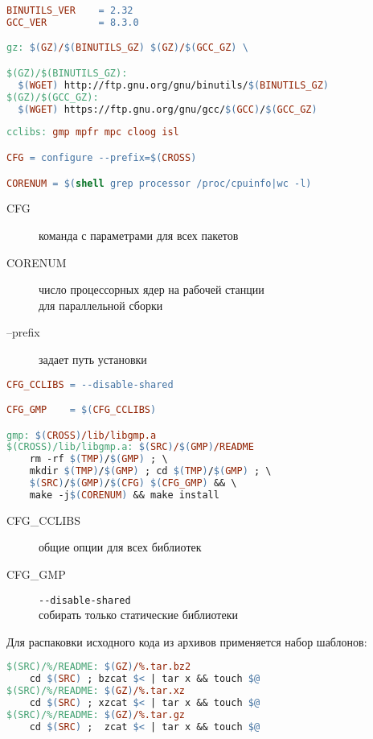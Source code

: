 \clearpage
\begin{lstlisting}[language=make]
BINUTILS_VER	= 2.32
GCC_VER			= 8.3.0

gz: $(GZ)/$(BINUTILS_GZ) $(GZ)/$(GCC_GZ) \

$(GZ)/$(BINUTILS_GZ):
  $(WGET) http://ftp.gnu.org/gnu/binutils/$(BINUTILS_GZ)
$(GZ)/$(GCC_GZ):
  $(WGET) https://ftp.gnu.org/gnu/gcc/$(GCC)/$(GCC_GZ)
\end{lstlisting}

\begin{lstlisting}[language=make]
cclibs: gmp mpfr mpc cloog isl

CFG = configure --prefix=$(CROSS)

CORENUM = $(shell grep processor /proc/cpuinfo|wc -l)
\end{lstlisting}


\begin{description}
\item[CFG] команда  с параметрами для всех пакетов
\item[CORENUM] число процессорных ядер на рабочей станции\\ для параллельной
сборки
\item[--prefix] задает путь установки
\end{description}

\begin{lstlisting}[language=make]
CFG_CCLIBS = --disable-shared

CFG_GMP    = $(CFG_CCLIBS)

gmp: $(CROSS)/lib/libgmp.a
$(CROSS)/lib/libgmp.a: $(SRC)/$(GMP)/README
	rm -rf $(TMP)/$(GMP) ; \
	mkdir $(TMP)/$(GMP) ; cd $(TMP)/$(GMP) ; \
	$(SRC)/$(GMP)/$(CFG) $(CFG_GMP) && \
	make -j$(CORENUM) && make install
\end{lstlisting}

\begin{description}
\item[CFG\_CCLIBS] общие опции  для всех библиотек
\item[CFG\_GMP] \verb|--disable-shared|\\ собирать только статические библиотеки
\end{description}

\noindent
Для распаковки исходного кода из архивов применяется набор шаблонов:
\begin{lstlisting}[language=make]
$(SRC)/%/README: $(GZ)/%.tar.bz2
	cd $(SRC) ; bzcat $< | tar x && touch $@
$(SRC)/%/README: $(GZ)/%.tar.xz
	cd $(SRC) ; xzcat $< | tar x && touch $@
$(SRC)/%/README: $(GZ)/%.tar.gz
	cd $(SRC) ;  zcat $< | tar x && touch $@
\end{lstlisting}

